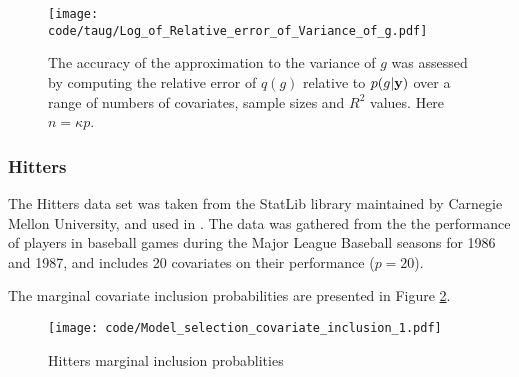 \documentclass{amsart}[12pt]
\begin{document}
\begin{figure}[p]
	\texttt{[image: code/taug/Log\_of\_Relative\_error\_of\_Variance\_of\_g.pdf]}
	\caption{The accuracy of the approximation to the variance of $g$ was assessed by computing the relative
		error of $q(g)$ relative to $p(g | {\bf y})$ over a range
		of numbers of covariates, sample sizes and $R^2$  values. Here $n = \kappa p$.}
	\label{fig:rel_error_var_g}
\end{figure}





\subsubsection{Hitters}

The Hitters data set was taken from the StatLib library maintained by Carnegie Mellon University, and used in
\cite{James:2014:ISL:2517747}. The data was gathered from the the performance of players in baseball games
during the Major League Baseball seasons for 1986 and 1987, and includes 20 covariates on their performance
($p=20$).

The marginal covariate inclusion probabilities are presented in Figure \ref{fig:Hitters_inclusion}.

\begin{figure}[p]
	\texttt{[image: code/Model\_selection\_covariate\_inclusion\_1.pdf]}
	\caption{Hitters marginal inclusion probablities}
	\label{fig:Hitters_inclusion}
\end{figure}
\end{document}
